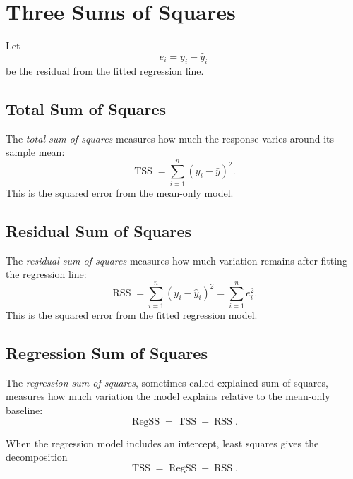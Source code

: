 \section{Three Sums of Squares}

Let
\begin{equation}
  e_i=y_i-\widehat{y}_i
\end{equation}
be the residual from the fitted regression line.

\subsection{Total Sum of Squares}

The \emph{total sum of squares} measures how much the response varies around its sample mean:
\begin{equation}
  \operatorname{TSS}=\sum_{i=1}^n (y_i-\bar{y})^2.
  \label{eq:ch6-tss}
\end{equation}
This is the squared error from the mean-only model.

\subsection{Residual Sum of Squares}

The \emph{residual sum of squares} measures how much variation remains after fitting the regression line:
\begin{equation}
  \operatorname{RSS}=\sum_{i=1}^n (y_i-\widehat{y}_i)^2
  =\sum_{i=1}^n e_i^2.
  \label{eq:ch6-rss}
\end{equation}
This is the squared error from the fitted regression model.

\subsection{Regression Sum of Squares}

The \emph{regression sum of squares}, sometimes called explained sum of squares, measures how much variation the model explains relative to the mean-only baseline:
\begin{equation}
  \operatorname{RegSS}=\operatorname{TSS}-\operatorname{RSS}.
  \label{eq:ch6-regss}
\end{equation}

When the regression model includes an intercept, least squares gives the decomposition
\begin{equation}
  \boxed{\operatorname{TSS}=\operatorname{RegSS}+\operatorname{RSS}.}
  \label{eq:ch6-sum-of-squares-decomposition}
\end{equation}

